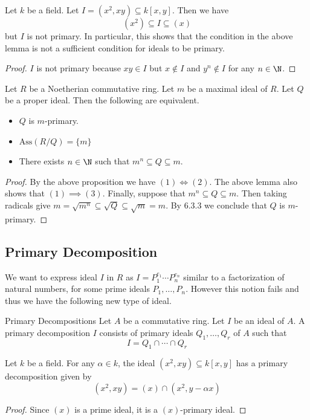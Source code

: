 \documentclass[a4paper]{article}
\begin{document}
\begin{eg}{}{} Let $k$ be a field. Let $I=(x^2,xy)\subseteq k[x,y]$. Then we have $$(x^2)\subseteq I\subseteq(x)$$ but $I$ is not primary. In particular, this shows that the condition in the above lemma is not a sufficient condition for ideals to be primary. 
\begin{proof}
$I$ is not primary because $xy\in I$ but $x\notin I$ and $y^n\notin I$ for any $n\in\N$. 
\end{proof}
\end{eg}

\begin{crl}{}{} Let $R$ be a Noetherian commutative ring. Let $m$ be a maximal ideal of $R$. Let $Q$ be a proper ideal. Then the following are equivalent. 
\begin{itemize}
\item $Q$ is $m$-primary. 
\item $\text{Ass}(R/Q)=\{m\}$
\item There exists $n\in\N$ such that $m^n\subseteq Q\subseteq m$. 
\end{itemize} 
\begin{proof}
By the above proposition we have $(1)\iff(2)$. The above lemma also shows that $(1)\implies(3)$. Finally, suppose that $m^n\subseteq Q\subseteq m$. Then taking radicals give $m=\sqrt{m^n}\subseteq\sqrt{Q}\subseteq\sqrt{m}=m$. By 6.3.3 we conclude that $Q$ is $m$-primary. 
\end{proof}
\end{crl}

\subsection{Primary Decomposition}
We want to express ideal $I$ in $R$ as $I=P_1^{e_1}\cdots P_n^{e_n}$ similar to a factorization of natural numbers, for some prime ideals $P_1,\dots,P_n$. However this notion fails and thus we have the following new type of ideal. 

\begin{defn}{Primary Decompositions}{} Let $A$ be a commutative ring. Let $I$ be an ideal of $A$. A primary decomposition $I$ consists of primary ideals $Q_1,\dots,Q_r$ of $A$ such that $$I=Q_1\cap\cdots\cap Q_r$$
\end{defn}

\begin{eg}{}{} Let $k$ be a field. For any $\alpha\in k$, the ideal $(x^2,xy)\subseteq k[x,y]$ has a primary decomposition given by $$(x^2,xy)=(x)\cap(x^2,y-\alpha x)$$ 
\begin{proof}
Since $(x)$ is a prime ideal, it is a $(x)$-primary ideal. 
\end{proof}
\end{eg}
\end{document}
